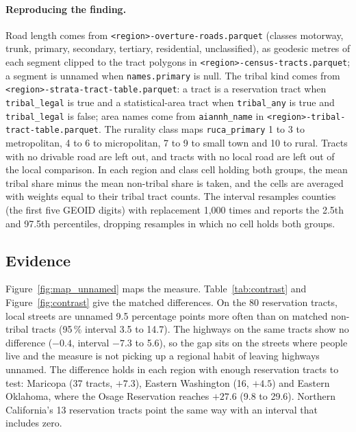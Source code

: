 \documentclass[11pt]{article}
\begin{document}
\paragraph{Reproducing the finding.} Road length comes from
\nolinkurl{<region>-overture-roads.parquet} (classes motorway, trunk, primary,
secondary, tertiary, residential, unclassified), as geodesic metres of each
segment clipped to the tract polygons in \nolinkurl{<region>-census-tracts.parquet};
a segment is unnamed when \texttt{names.primary} is null. The tribal kind comes
from \nolinkurl{<region>-strata-tract-table.parquet}: a tract is a reservation
tract when \texttt{tribal\_legal} is true and a statistical-area tract when
\texttt{tribal\_any} is true and \texttt{tribal\_legal} is false; area names come
from \texttt{aiannh\_name} in \nolinkurl{<region>-tribal-tract-table.parquet}. The
rurality class maps \texttt{ruca\_primary} 1 to 3 to metropolitan, 4 to 6 to
micropolitan, 7 to 9 to small town and 10 to rural. Tracts with no drivable
road are left out, and tracts with no local road are left out of the local
comparison. In each region and class cell holding both groups, the mean
tribal share minus the mean non-tribal share is taken, and the cells are
averaged with weights equal to their tribal tract counts. The interval
resamples counties (the first five GEOID digits) with replacement 1,000
times and reports the 2.5th and 97.5th percentiles, dropping resamples in
which no cell holds both groups.

\subsection{Evidence}

Figure~\ref{fig:map_unnamed} maps the measure.
Table~\ref{tab:contrast} and Figure~\ref{fig:contrast} give the matched
differences. On the 80 reservation tracts, local streets are unnamed 9.5
percentage points more often than on matched non-tribal tracts (95\,\%
interval 3.5 to 14.7). The highways on the same tracts show no difference
($-0.4$, interval $-7.3$ to 5.6), so the gap sits on the streets where people
live and the measure is not picking up a regional habit of leaving highways
unnamed. The difference holds in each region with enough reservation tracts
to test: Maricopa (37 tracts, $+7.3$), Eastern Washington (16, $+4.5$) and
Eastern Oklahoma, where the Osage Reservation reaches $+27.6$ (9.8 to 29.6).
Northern California's 13 reservation tracts point the same way with an
interval that includes zero.
\end{document}
